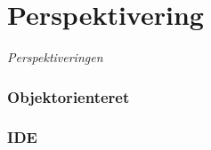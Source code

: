 \chapter{Perspektivering}
\label{sec:Perspektivering}

\textit{Perspektiveringen}

\subsection*{Objektorienteret}
\subsection*{IDE}